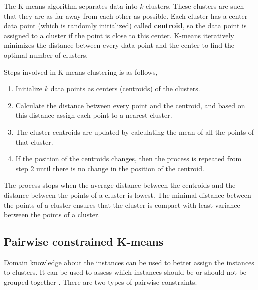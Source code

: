 
The K-means algorithm separates data into $k$ clusters.  These clusters are such that they are as far away from each other as possible. Each cluster has a center data point (which is randomly initialized) called \textbf{centroid}, so the data point is assigned to a cluster if the point is close to this center.  K-means iteratively minimizes the distance between every data point and the center to find the optimal number of clusters.

Steps involved in K-means clustering is as follows,

\begin{enumerate}
    \item Initialize $k$ data points as centers (centroids) of the clusters.
    \item Calculate the distance between every point and the centroid, and based on this distance assign each point to a nearest cluster.
    \item The cluster centroids are updated by calculating the mean of all the points of that cluster.
    \item If the position of the centroids changes, then the process is repeated from step 2 until there is no change in the position of the centroid.
\end{enumerate}

The process stops when the average distance between the centroids and the distance between the points of a cluster is lowest. The minimal distance between the points of a cluster ensures that the cluster is compact with least variance between the points of a cluster.



\subsection{Pairwise constrained K-means } \label{constrainedKMeans}

Domain knowledge about the instances can be used to better assign the instances to clusters. It can be used to assess which instances should be or should not be grouped together \cite{wagstaff2001constrained}. There are two types of pairwise constraints.


